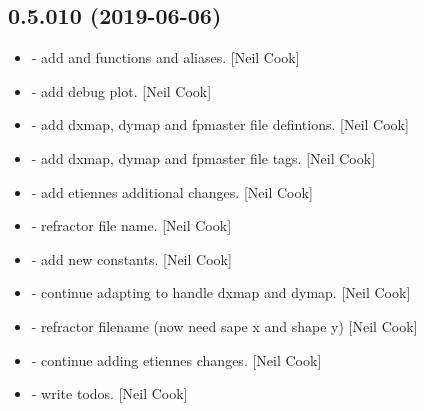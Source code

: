 \documentclass[a4paper,10pt,english]{report}
\begin{document}
\subsection{0.5.010 (2019-06-06)}
\label{\detokenize{misc/changelog:id127}}\begin{itemize}
\item {} 
 - add  and  functions and
aliases. {[}Neil Cook{]}

\item {} 
 - add  debug plot. {[}Neil
Cook{]}

\item {} 
 - add dxmap, dymap and fpmaster file defintions. {[}Neil
Cook{]}

\item {} 
 - add dxmap, dymap and fpmaster file tags. {[}Neil Cook{]}

\item {} 
 - add etiennes additional changes. {[}Neil Cook{]}

\item {} 
 - refractor file name. {[}Neil Cook{]}

\item {} 
 - add new  constants. {[}Neil Cook{]}

\item {} 
 - continue adapting  to handle
dxmap and dymap. {[}Neil Cook{]}

\item {} 
 - refractor filename (now need sape x and shape y)
{[}Neil Cook{]}

\item {} 
 - continue adding etiennes changes. {[}Neil Cook{]}

\item {} 
 - write todos. {[}Neil Cook{]}

\end{itemize}
\end{document}
